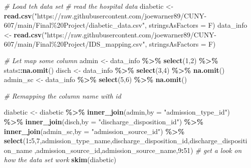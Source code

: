 \documentclass[
]{article}
\newenvironment{Shaded}{\begin{snugshade}}{\end{snugshade}}
\newcommand{\AttributeTok}[1]{\textcolor[rgb]{0.13,0.29,0.53}{#1}}
\newcommand{\CommentTok}[1]{\textcolor[rgb]{0.56,0.35,0.01}{\textit{#1}}}
\newcommand{\DecValTok}[1]{\textcolor[rgb]{0.00,0.00,0.81}{#1}}
\newcommand{\FunctionTok}[1]{\textcolor[rgb]{0.13,0.29,0.53}{\textbf{#1}}}
\newcommand{\NormalTok}[1]{#1}
\newcommand{\OtherTok}[1]{\textcolor[rgb]{0.56,0.35,0.01}{#1}}
\newcommand{\SpecialCharTok}[1]{\textcolor[rgb]{0.81,0.36,0.00}{\textbf{#1}}}
\newcommand{\StringTok}[1]{\textcolor[rgb]{0.31,0.60,0.02}{#1}}
\begin{document}
\begin{Shaded}
\begin{Highlighting}[]
\CommentTok{\# Load teh data set }
\CommentTok{\# read the hospital data }
\NormalTok{diabetic }\OtherTok{\textless{}{-}} \FunctionTok{read.csv}\NormalTok{(}\StringTok{"https://raw.githubusercontent.com/joewarner89/CUNY{-}607/main/Final\%20Project/diabetic\_data.csv"}\NormalTok{, }\AttributeTok{stringsAsFactors =}\NormalTok{ F)}
\NormalTok{data\_info }\OtherTok{\textless{}{-}} \FunctionTok{read.csv}\NormalTok{(}\StringTok{"https://raw.githubusercontent.com/joewarner89/CUNY{-}607/main/Final\%20Project/IDS\_mapping.csv"}\NormalTok{, }\AttributeTok{stringsAsFactors =}\NormalTok{ F)}

\CommentTok{\# Let map some column }
\NormalTok{admin }\OtherTok{\textless{}{-}}\NormalTok{ data\_info }\SpecialCharTok{\%\textgreater{}\%} \FunctionTok{select}\NormalTok{(}\DecValTok{1}\NormalTok{,}\DecValTok{2}\NormalTok{) }\SpecialCharTok{\%\textgreater{}\%}\NormalTok{ stats}\SpecialCharTok{::}\FunctionTok{na.omit}\NormalTok{()}
\NormalTok{disch }\OtherTok{\textless{}{-}}\NormalTok{ data\_info }\SpecialCharTok{\%\textgreater{}\%} \FunctionTok{select}\NormalTok{(}\DecValTok{3}\NormalTok{,}\DecValTok{4}\NormalTok{) }\SpecialCharTok{\%\textgreater{}\%} \FunctionTok{na.omit}\NormalTok{()}
\NormalTok{admin\_sc }\OtherTok{\textless{}{-}}\NormalTok{ data\_info }\SpecialCharTok{\%\textgreater{}\%} \FunctionTok{select}\NormalTok{(}\DecValTok{5}\NormalTok{,}\DecValTok{6}\NormalTok{) }\SpecialCharTok{\%\textgreater{}\%} \FunctionTok{na.omit}\NormalTok{()}

\CommentTok{\# Remapping the column name with id }

\NormalTok{diabetic }\OtherTok{\textless{}{-}}\NormalTok{ diabetic }\SpecialCharTok{\%\textgreater{}\%} \FunctionTok{inner\_join}\NormalTok{(admin,}\AttributeTok{by =}  \StringTok{"admission\_type\_id"}\NormalTok{) }\SpecialCharTok{\%\textgreater{}\%} 
  \FunctionTok{inner\_join}\NormalTok{(disch,}\AttributeTok{by =} \StringTok{"discharge\_disposition\_id"}\NormalTok{) }\SpecialCharTok{\%\textgreater{}\%} 
  \FunctionTok{inner\_join}\NormalTok{(admin\_sc,}\AttributeTok{by =} \StringTok{"admission\_source\_id"}\NormalTok{) }\SpecialCharTok{\%\textgreater{}\%} 
  \FunctionTok{select}\NormalTok{(}\DecValTok{1}\SpecialCharTok{:}\DecValTok{5}\NormalTok{,}\DecValTok{7}\NormalTok{,admission\_type\_name,discharge\_disposition\_id,discharge\_disposition\_name}
\NormalTok{        ,admission\_source\_id,admission\_source\_name,}\DecValTok{9}\SpecialCharTok{:}\DecValTok{51}\NormalTok{)}
\CommentTok{\# get a look on how the data set work}
\FunctionTok{skim}\NormalTok{(diabetic)}
\end{Highlighting}
\end{Shaded}
\end{document}
